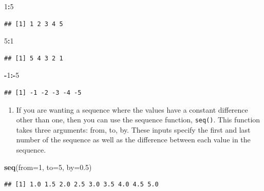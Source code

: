 \documentclass[
]{book}
\newenvironment{Shaded}{\begin{snugshade}}{\end{snugshade}}
\newcommand{\AttributeTok}[1]{\textcolor[rgb]{0.13,0.29,0.53}{#1}}
\newcommand{\DecValTok}[1]{\textcolor[rgb]{0.00,0.00,0.81}{#1}}
\newcommand{\FloatTok}[1]{\textcolor[rgb]{0.00,0.00,0.81}{#1}}
\newcommand{\FunctionTok}[1]{\textcolor[rgb]{0.13,0.29,0.53}{\textbf{#1}}}
\newcommand{\NormalTok}[1]{#1}
\newcommand{\SpecialCharTok}[1]{\textcolor[rgb]{0.81,0.36,0.00}{\textbf{#1}}}
\providecommand{\tightlist}{%
  \setlength{\itemsep}{0pt}\setlength{\parskip}{0pt}}
\theoremstyle{definition}
\theoremstyle{definition}
\theoremstyle{definition}
\theoremstyle{definition}
\theoremstyle{remark}
\begin{document}
\begin{Shaded}
\begin{Highlighting}[]
\DecValTok{1}\SpecialCharTok{:}\DecValTok{5}
\end{Highlighting}
\end{Shaded}

\begin{verbatim}
## [1] 1 2 3 4 5
\end{verbatim}

\begin{Shaded}
\begin{Highlighting}[]
\DecValTok{5}\SpecialCharTok{:}\DecValTok{1}
\end{Highlighting}
\end{Shaded}

\begin{verbatim}
## [1] 5 4 3 2 1
\end{verbatim}

\begin{Shaded}
\begin{Highlighting}[]
\SpecialCharTok{{-}}\DecValTok{1}\SpecialCharTok{:{-}}\DecValTok{5}
\end{Highlighting}
\end{Shaded}

\begin{verbatim}
## [1] -1 -2 -3 -4 -5
\end{verbatim}

\begin{enumerate}
\def\labelenumi{\arabic{enumi}.}
\setcounter{enumi}{1}
\tightlist
\item
  If you are wanting a sequence where the values have a constant difference other than one, then you can use the sequence function, \texttt{seq()}. This function takes three arguments: from, to, by. These inputs specify the first and last number of the sequence as well as the difference between each value in the sequence.
\end{enumerate}

\begin{Shaded}
\begin{Highlighting}[]
\FunctionTok{seq}\NormalTok{(}\AttributeTok{from=}\DecValTok{1}\NormalTok{, }\AttributeTok{to=}\DecValTok{5}\NormalTok{, }\AttributeTok{by=}\FloatTok{0.5}\NormalTok{)}
\end{Highlighting}
\end{Shaded}

\begin{verbatim}
## [1] 1.0 1.5 2.0 2.5 3.0 3.5 4.0 4.5 5.0
\end{verbatim}
\end{document}
